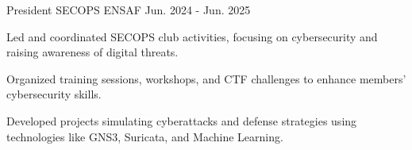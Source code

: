 

\begin{cventries}

  \cventry
    {President} %
    {SECOPS} %
    {ENSAF} %
    {Jun. 2024 - Jun. 2025} %
    {
      \begin{cvitems} %
        \item {Led and coordinated SECOPS club activities, focusing on cybersecurity and raising awareness of digital threats.}
        \item {Organized training sessions, workshops, and CTF challenges to enhance members' cybersecurity skills.}
        \item {Developed projects simulating cyberattacks and defense strategies using technologies like GNS3, Suricata, and Machine Learning.}
      \end{cvitems}
    }

\end{cventries}
